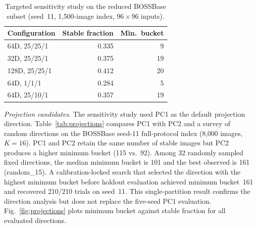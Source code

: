 \documentclass[10pt,journal]{IEEEtran}
\begin{document}
\begin{table}[t]
\centering
\caption{Targeted sensitivity study on the reduced BOSSBase subset
  (seed~11, 1{,}500-image index, $96\times96$ inputs).}
\label{tab:sensitivity}
\small
\begin{tabular}{lrr}
\toprule
Configuration & Stable fraction & Min.\ bucket\\
\midrule
64D, 25/25/1  & 0.335 & 9\\
32D, 25/25/1  & 0.375 & 19\\
128D, 25/25/1 & 0.412 & 20\\
64D, 1/1/1    & 0.284 & 5\\
64D, 25/10/1  & 0.357 & 19\\
\bottomrule
\end{tabular}
\end{table}

\textit{Projection candidates.}
The sensitivity study used PC1 as the default projection direction.
Table~\ref{tab:projections} compares PC1 with PC2 and a survey of
random directions on the BOSSBase seed-11 full-protocol index
(8{,}000 images, $K{=}16$). PC1 and PC2 retain the same number of
stable images but PC2 produces a higher minimum bucket (115 vs.\ 92).
Among 32 randomly sampled fixed directions, the median minimum bucket
is 101 and the best observed is 161 (random\_15). A calibration-locked
search that selected the direction with the highest minimum bucket
before holdout evaluation achieved minimum bucket~161 and recovered
210/210 trials on seed~11. This single-partition result confirms the
direction analysis but does not replace the five-seed PC1 evaluation.
Fig.~\ref{fig:projections} plots minimum bucket against stable
fraction for all evaluated directions.

\begin{table}[t]
\centering
\caption{Projection candidates on BOSSBase seed-11 ($K{=}16$,
  8{,}000-image index). PC1 and PC2 retain the same stable images
  (2{,}823) but differ in bucket balance. The calibration-locked
  random direction (best of 32 trials) achieves the highest minimum
  bucket.}
\label{tab:projections}
\footnotesize
{}
\end{table}
\end{document}

